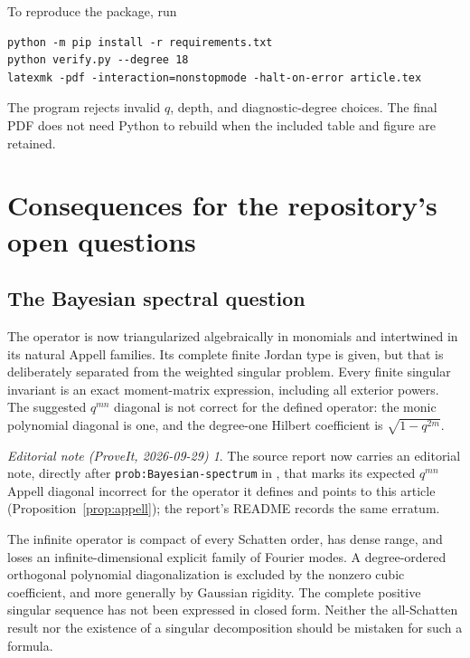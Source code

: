 \documentclass[11pt,a4paper]{article}
\numberwithin{equation}{section}
\theoremstyle{definition}\newtheorem{definition}[theorem]{Definition}
\theoremstyle{remark}\newtheorem{remark}[theorem]{Remark}
\newtheorem*{ednote}{Editorial note (ProveIt, 2026-09-29)}
\begin{document}
To reproduce the package, run
\begin{verbatim}
python -m pip install -r requirements.txt
python verify.py --degree 18
latexmk -pdf -interaction=nonstopmode -halt-on-error article.tex
\end{verbatim}
The program rejects invalid $q$, depth, and diagnostic-degree choices. The final PDF does not need Python to rebuild when the included table and figure are retained.

\section{Consequences for the repository's open questions}
\label{sec:answers}
\subsection{The Bayesian spectral question}
The operator is now triangularized algebraically in monomials and intertwined in its natural Appell families. Its complete finite Jordan type is given, but that is deliberately separated from the weighted singular problem. Every finite singular invariant is an exact moment-matrix expression, including all exterior powers. The suggested $q^{mn}$ diagonal is not correct for the defined operator: the monic polynomial diagonal is one, and the degree-one Hilbert coefficient is $\sqrt{1-q^{2m}}$.

\begin{ednote}
The source report now carries an editorial note, directly after
\texttt{prob:Bayesian-spectrum} in
,
that marks its expected $q^{mn}$ Appell diagonal incorrect for the operator
it defines and points to this article (Proposition~\ref{prop:appell}); the report's
README records the same erratum.
\end{ednote}

The infinite operator is compact of every Schatten order, has dense range, and loses an infinite-dimensional explicit family of Fourier modes. A degree-ordered orthogonal polynomial diagonalization is excluded by the nonzero cubic coefficient, and more generally by Gaussian rigidity. The complete positive singular sequence has not been expressed in closed form. Neither the all-Schatten result nor the existence of a singular decomposition should be mistaken for such a formula.
\end{document}
